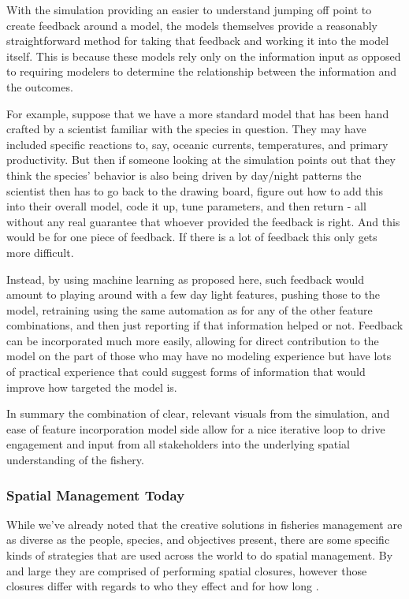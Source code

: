 \documentclass[11pt]{article}
\begin{document}
With the simulation providing an easier to understand jumping off point to create feedback around a model, the models themselves provide a reasonably straightforward method for taking that feedback and working it into the model itself. This is because these models rely only on the information input as opposed to requiring modelers to determine the relationship between the information and the outcomes. 

For example, suppose that we have a more standard model that has been hand crafted by a scientist familiar with the species in question. They may have included specific reactions to, say, oceanic currents, temperatures, and primary productivity. But then if someone looking at the simulation points out that they think the species' behavior is also being driven by day/night patterns the scientist then has to go back to the drawing board, figure out how to add this into their overall model, code it up, tune parameters, and then return - all without any real guarantee that whoever provided the feedback is right. And this would be for one piece of feedback. If there is a lot of feedback this only gets more difficult. 

Instead, by using machine learning as proposed here, such feedback would amount to playing around with a few day light features, pushing those to the model, retraining using the same automation as for any of the other feature combinations, and then just reporting if that information helped or not. Feedback can be incorporated much more easily, allowing for direct contribution to the model on the part of those who may have no modeling experience but have lots of practical experience that could suggest forms of information that would improve how targeted the model is.
\newline

In summary the combination of clear, relevant visuals from the simulation, and ease of feature incorporation model side allow for a nice iterative loop to drive engagement and input from all stakeholders into the underlying spatial understanding of the fishery.  

\subsubsection{Spatial Management Today} 

While we've already noted that the creative solutions in fisheries management are as diverse as the people, species, and objectives present, there are some specific kinds of strategies that are used across the world to do spatial management. By and large they are comprised of performing spatial closures, however those closures differ with regards to who they effect and for how long \citep{selig2016} \citep{little2014}. \newline
\end{document}
